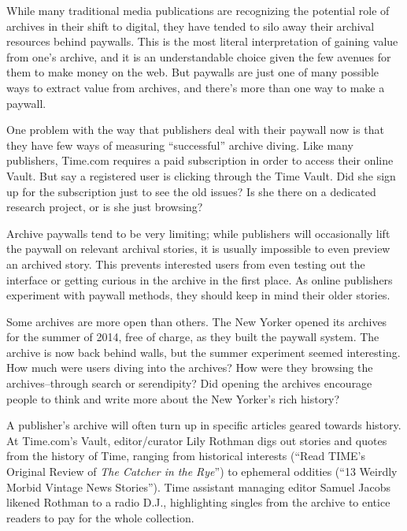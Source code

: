 While many traditional media publications are recognizing the potential role of archives in their shift to digital, they have tended to silo away their archival resources behind paywalls. This is the most literal interpretation of gaining value from one's archive, and it is an understandable choice given the few avenues for them to make money on the web. But paywalls are just one of many possible ways to extract value from archives, and there's more than one way to make a paywall.

One problem with the way that publishers deal with their paywall now is that they have few ways of measuring ``successful'' archive diving. Like many publishers, Time.com requires a paid subscription in order to access their online Vault. But say a registered user is clicking through the Time Vault. Did she sign up for the subscription just to see the old issues? Is she there on a dedicated research project, or is she just browsing?

Archive paywalls tend to be very limiting; while publishers will occasionally lift the paywall on relevant archival stories, it is usually impossible to even preview an archived story. This prevents interested users from even testing out the interface or getting curious in the archive in the first place. As online publishers experiment with paywall methods, they should keep in mind their older stories.

Some archives are more open than others. The New Yorker opened its archives for the summer of 2014, free of charge, as they built the paywall system. The archive is now back behind walls, but the summer experiment seemed interesting. How much were users diving into the archives? How were they browsing the archives--through search or serendipity? Did opening the archives encourage people to think and write more about the New Yorker's rich history?


A publisher's archive will often turn up in specific articles geared towards history. At Time.com's Vault, editor/curator Lily Rothman digs out stories and quotes from the history of Time, ranging from historical interests (``Read TIME's Original Review of \emph{The Catcher in the Rye}'') to ephemeral oddities (``13 Weirdly Morbid Vintage News Stories''). Time assistant managing editor Samuel Jacobs likened Rothman to a radio D.J., highlighting singles from the archive to entice readers to pay for the whole collection.\autocite{}

